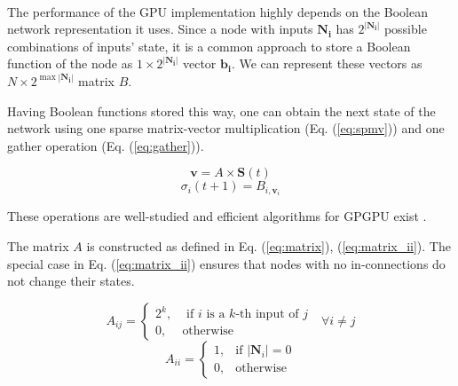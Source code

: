 \documentclass[procedia]{easychair}
\begin{document}
	\paragraph{} The performance of the GPU implementation highly depends on the Boolean network representation it uses. Since a node with inputs \(\mathbf{N_i}\) has \(2^{|\mathbf{N_i}|}\) possible combinations of inputs' state, it is a common approach to store a Boolean function of the node as \(1 \times 2^{|\mathbf{N_i}|}\) vector \(\mathbf{b_i}\). We can represent these vectors as \(N \times 2^{\max{|\mathbf{N_i}|}}\) matrix \(B\).
	
	Having Boolean functions stored this way, one can obtain the next state of the network using one sparse matrix-vector multiplication (Eq. (\ref{eq:spmv})) and one gather operation (Eq. (\ref{eq:gather})).
	
	\begin{equation}
	\label{eq:spmv}
		\mathbf{v} = A \times \mathbf{S}(t)
	\end{equation}
	\begin{equation}
	\label{eq:gather}
		\sigma_i(t+1) = B_{i, \mathbf{v}_i}
	\end{equation}
	
	These operations are well-studied and efficient algorithms for GPGPU exist \cite{bell2008efficient}\cite{he2007efficient}.
	
	The matrix \(A\) is constructed as defined in Eq. (\ref{eq:matrix}), (\ref{eq:matrix_ii}). The special case in Eq. (\ref{eq:matrix_ii}) ensures that nodes with no in-connections do not change their states.
	
	\begin{equation}
		\label{eq:matrix}
		A_{ij} = \begin{cases}
			2^k, & \mbox{ if } i\mbox{ is a } k \mbox{-th input of } j \\
			0, & \mbox{otherwise}
		\end{cases} \mbox{  } \forall i \neq j
	\end{equation}
	\begin{equation}
	\label{eq:matrix_ii}
	A_{ii} = \begin{cases}
		1, & \mbox{if } |\mathbf{N}_i|=0\\
		0, & \mbox{otherwise}
		\end{cases}
	\end{equation}
	
\end{document}
